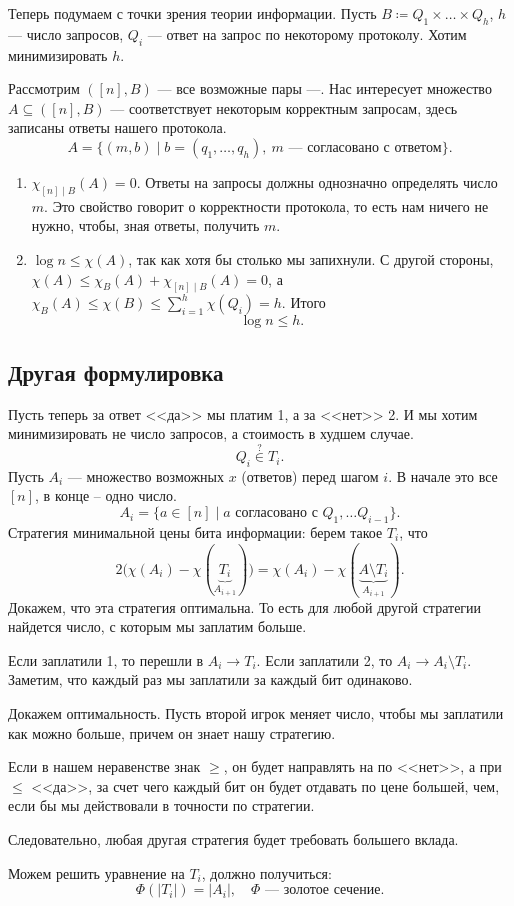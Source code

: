 Теперь подумаем с точки зрения теории информации. Пусть $ B \coloneqq Q_1 \times \ldots \times Q_h$, $ h$ --- число запросов, $ Q_i$ --- ответ на запрос по некоторому протоколу.
Хотим минимизировать $ h$.

Рассмотрим $ ([n], B)$ --- все возможные пары ---. Нас интересует множество  $ A \subseteq ([n], B)$ --- соответствует некоторым корректным запросам, здесь записаны ответы нашего протокола.
\[
	A = \{(m, b) \mid b = (q_1, \ldots , q_h), ~ m \text{ --- согласовано с ответом}\}
.\] 

\begin{enumerate}
	\item $ \chi _{[n] \mid B}(A) = 0$. Ответы на запросы должны однозначно определять число $ m$. Это свойство говорит о корректности протокола, то есть нам ничего не нужно, чтобы, зная ответы, получить $ m$.
	\item $ \log n \le \chi(A)$, так как хотя бы столько мы запихнули. С другой стороны, $ \chi(A) \le \chi_{B}(A) + \chi_{[n] \mid B}(A) = 0$, а $ \chi_B(A) \le \chi\left( B \right) \le \sum_{i=1}^{h} \chi(Q_i) = h $. 
		Итого
		\[
		\log n \le  h
		.\] 
\end{enumerate} 

\subsection{Другая формулировка}
Пусть теперь за ответ <<да>> мы платим 1, а за <<нет>> 2. И мы хотим минимизировать не число запросов, а стоимость в худшем случае.
 \[
Q_i \stackrel{?}{\in} T_i
.\] 
Пусть $ A_i$ --- множество возможных $ x$ (ответов) перед шагом $ i$. В начале это все $ [n]$, в конце -- одно число.
\[
	A_i = \{a \in [n] \mid a \text{ согласовано с } Q_1, \ldots Q_{i-1}\}
.\] 
Стратегия минимальной цены бита информации: берем такое $ T_i$, что
 \[
	 2\bigl(\chi(A_i) - \chi(\underbrace{T_i}_{A_{i+1}})\bigr) = \chi(A_i) - \chi(\underbrace{A \setminus T_i}_{A_{i+1}})
.\] 
Докажем, что эта стратегия оптимальна. То есть для любой другой стратегии найдется число, с которым мы заплатим больше.

Если заплатили 1, то перешли в  $ A_i \to T_i$. Если заплатили 2, то $ A_i \to A_{i} \setminus T_i$. Заметим, что каждый раз мы заплатили за каждый бит одинаково.

Докажем оптимальность. Пусть второй игрок меняет число, чтобы мы заплатили как можно больше, причем он знает нашу стратегию.

Если в нашем неравенстве знак $ \ge $, он будет направлять на по <<нет>>, а при  $ \le$ <<да>>, за счет чего каждый бит он будет отдавать по цене большей, чем, если бы мы действовали в точности по стратегии. 

Следовательно, любая другая стратегия будет требовать большего вклада.

Можем решить уравнение на $ T_i$, должно получиться:
 \[
	 \Phi(\lvert T_i \rvert ) = \lvert A_i \rvert, \quad \Phi \text{ --- золотое сечение} 
.\] 

